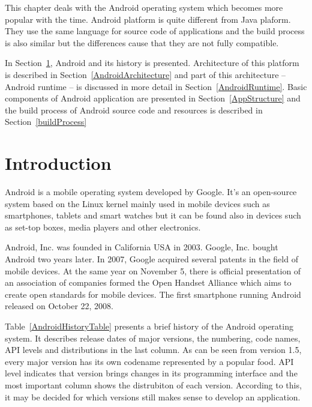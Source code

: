 This chapter deals with the Android operating system which becomes more popular with the time. Android platform is quite different from Java plaform. They use the same language for source code of applications and the build process is also similar but the differences cause that they are not fully compatible.

In Section~\ref{AndroidIntroduction}, Android and its history is presented. Architecture of this platform is described in Section~\ref{AndroidArchitecture} and part of this architecture -- Android runtime -- is discussed in more detail in Section~\ref{AndroidRuntime}. Basic components of Android application are presented in Section~\ref{AppStructure} and the build process of Android source code and resources is described in Section~\ref{buildProcess}

\section{Introduction}\label{AndroidIntroduction}
Android \cite{AndroidBook, AndroidProgBook} is a mobile operating system developed by Google. It's an open-source system based on the Linux kernel mainly used in mobile devices such as smartphones, tablets and smart watches but it can be found also in devices such as set-top boxes, media players and other electronics.

Android, Inc. was founded in California USA in 2003. Google, Inc. bought Android two years later. In 2007, Google acquired several patents in the field of mobile devices. At the same year on November 5, there is official presentation of an association of companies formed the Open Handset Alliance which aims to create open standards for mobile devices. The first smartphone running Android released on October 22, 2008.

Table~\ref{AndroidHistoryTable} presents a brief history of the Android operating system. It describes release dates of
major versions, the numbering, code names, API levels and distributions in the last column. As can be seen from version
1.5, every major version has its own codename represented by a popular food. API level indicates that version brings
changes in its programming interface and the most important column shows the distrubiton of each version. According to
this, it may be decided for which versions still makes sense to develop an application.

